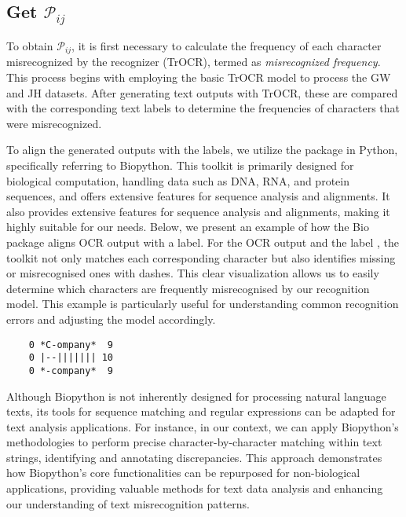 \subsection{Get $\mathcal{P}_{ij}$}
\label{subsec:3_get_pij}
To obtain $\mathcal{P}_{ij}$, it is first necessary to calculate the frequency of each character misrecognized by the recognizer (TrOCR), termed as \emph{misrecognized frequency}. This process begins with employing the basic TrOCR model to process the GW and JH datasets. After generating text outputs with TrOCR, these are compared with the corresponding text labels to determine the frequencies of characters that were misrecognized.

To align the generated outputs with the labels, we utilize the  package in Python, specifically referring to Biopython. This toolkit is primarily designed for biological computation, handling data such as DNA, RNA, and protein sequences, and offers extensive features for sequence analysis and alignments. It also provides extensive features for sequence analysis and alignments, making it highly suitable for our needs. Below, we present an example of how the Bio package aligns OCR output with a label. For the OCR output  and the label , the toolkit not only matches each corresponding character but also identifies missing or misrecognised ones with dashes. This clear visualization allows us to easily determine which characters are frequently misrecognised by our recognition model. This example is particularly useful for understanding common recognition errors and adjusting the model accordingly.

\begin{center}
    \begin{minipage}{0.3\textwidth} 
    \begin{verbatim}
    0 *C-ompany*  9
    0 |--||||||| 10
    0 *-company*  9
    \end{verbatim}
    \end{minipage}
\end{center}


Although Biopython is not inherently designed for processing natural language texts, its tools for sequence matching and regular expressions can be adapted for text analysis applications. For instance, in our context, we can apply Biopython's methodologies to perform precise character-by-character matching within text strings, identifying and annotating discrepancies. This approach demonstrates how Biopython's core functionalities can be repurposed for non-biological applications, providing valuable methods for text data analysis and enhancing our understanding of text misrecognition patterns.

